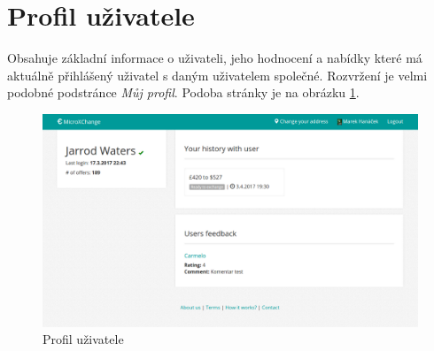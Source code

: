 \section{Profil uživatele}

\label{nur:user-profile}

Obsahuje základní informace o uživateli, jeho hodnocení a nabídky které má aktuálně přihlášený uživatel s daným uživatelem společné. Rozvržení je velmi podobné podstránce \textit{Můj profil}. Podoba stránky je na obrázku \ref{fig:tur:user-profile}.

\begin{figure}[h]
    \centering
    \includegraphics[width=1.0\textwidth]{media/tur/user-profile.png}
    \caption{Profil uživatele}
    \label{fig:tur:user-profile}
\end{figure}
